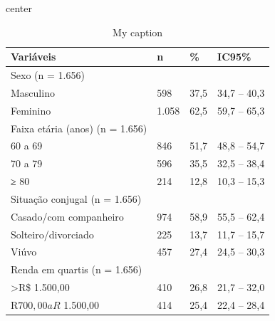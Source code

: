 \documentclass{article}
\begin{document}




\begin{table}
\caption{My caption}
\label{my-label}
\begin{adjustbox}{center}
\begin{tabularx}{\textwidth}{>{\raggedright}b{4cm}  *{3}{J}}\toprule
Variáveis                                            & n     & \%   & IC95\%      \\\midrule
Sexo (n = 1.656)                                     &       &      &             \\
Masculino                                            & 598   & 37,5 & 34,7 – 40,3 \\
Feminino                                             & 1.058 & 62,5 & 59,7 – 65,3 \\
Faixa etária (anos) (n = 1.656)                      &       &      &             \\
60 a 69                                              & 846   & 51,7 & 48,8 – 54,7 \\
70 a 79                                              & 596   & 35,5 & 32,5 – 38,4 \\
≥ 80                                                 & 214   & 12,8 & 10,3 – 15,3 \\
Situação conjugal (n = 1.656)                        &       &      &             \\
Casado/com companheiro                               & 974   & 58,9 & 55,5 – 62,4 \\
Solteiro/divorciado                                  & 225   & 13,7 & 11,7 – 15,7 \\
Viúvo                                                & 457   & 27,4 & 24,5 – 30,3 \\
Renda em quartis (n = 1.656)                         &       &      &             \\
\textgreater R\$ 1.500,00                            & 410   & 26,8 & 21,7 – 32,0 \\
R$ 700,00 a R$ 1.500,00                              & 414   & 25,4 & 22,4 – 28,4 \\

\end{tabularx}
\end{adjustbox}
\end{table}
\end{document}
